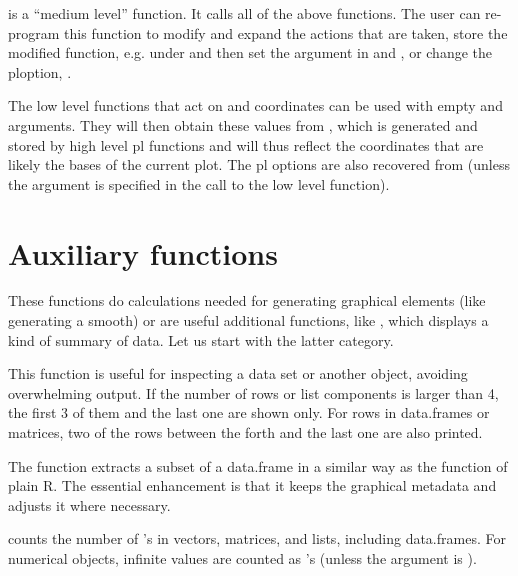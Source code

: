 \documentclass[11pt]{article}\usepackage[]{graphicx}\usepackage[]{color}
\begin{document}
 is a ``medium level'' function. It calls all of the above
functions.
The user can re-program this function to modify and expand the actions that
are taken, store the modified function, e.g. under 
and then set %
the argument  in  and ,
or change the ploption, .

The low level functions that act on  and  coordinates can be used
with empty  and  arguments. They will then obtain these values
from , which is generated and stored by high level 
pl functions and will thus reflect the coordinates that are likely the
bases of the current plot. 
The pl options are also recovered from  (unless the argument
 is specified in the call to the low level function).


\section{Auxiliary functions}
These functions do calculations needed for generating graphical elements
(like generating a smooth) or are useful additional functions,
like , which displays a kind of summary of data.
Let us start with the latter category.

This function is useful for inspecting a data set or another object, 
avoiding overwhelming output. 
If the number of rows or list components is larger than 4,
the first 3 of them and the last one are shown only.
For rows in data.frames or matrices, two of the rows between the forth and
the last one are also printed.

The function  extracts a subset of a data.frame in a similar way
as the  function of plain R.
The essential enhancement is that it keeps the graphical metadata and 
adjusts it where necessary.


 counts the number of 's in vectors, matrices, and lists, 
including data.frames. 
For numerical objects, infinite values are counted as 's 
(unless the argument  is ).
\end{document}
